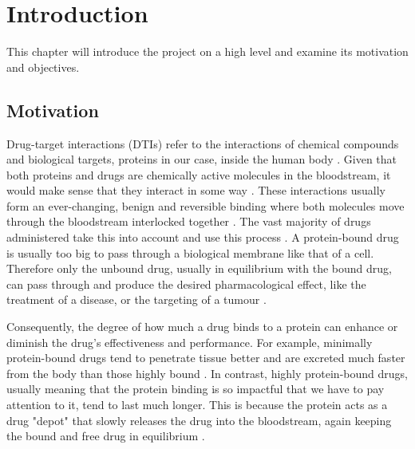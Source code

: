 \section{Introduction}

This chapter will introduce the project on a high level and examine its motivation and objectives.

\subsection{Motivation}
\label{subsec:Motivation}

Drug-target interactions (DTIs) refer to the interactions of chemical compounds and biological targets, proteins in our case, inside the human body \citep{Sachdev2019}. Given that both proteins and drugs are chemically active molecules in the bloodstream, it would make sense that they interact in some way \citep{DerangedPhysiology}. These interactions usually form an ever-changing, benign and reversible binding where both molecules move through the bloodstream interlocked together \citep{DerangedPhysiology}. The vast majority of drugs administered take this into account and use this process \citep{DerangedPhysiology}. A protein-bound drug is usually too big to pass through a biological membrane like that of a cell. Therefore only the unbound drug, usually in equilibrium with the bound drug, can pass through and produce the desired pharmacological effect, like the treatment of a disease, or the targeting of a tumour \citep{ProteinBindingOverview}. 

Consequently, the degree of how much a drug binds to a protein can enhance or diminish the drug's effectiveness and performance. For example, minimally protein-bound drugs tend to penetrate tissue better and are excreted much faster from the body than those highly bound \citep{Scheife1989}. In contrast, highly protein-bound drugs, usually meaning that the protein binding is so impactful that we have to pay attention to it, tend to last much longer. This is because the protein acts as a drug "depot" that slowly releases the drug into the bloodstream, again keeping the bound and free drug in equilibrium \citep{DerangedPhysiology, ProteinBindingOverview}.

